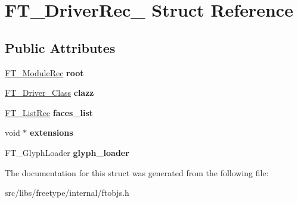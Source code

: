 \hypertarget{struct_f_t___driver_rec__}{
\section{FT\_\-DriverRec\_\- Struct Reference}
\label{struct_f_t___driver_rec__}
}
\subsection*{Public Attributes}
\begin{DoxyCompactItemize}
\item 
\hypertarget{struct_f_t___driver_rec___a8451ceb25c76794fb47e81f477c8222d}{
\hyperlink{struct_f_t___module_rec__}{FT\_\-ModuleRec} {\bfseries root}}
\label{struct_f_t___driver_rec___a8451ceb25c76794fb47e81f477c8222d}

\item 
\hypertarget{struct_f_t___driver_rec___a3111153608e5abeb093ed5eb7fef5aec}{
\hyperlink{struct_f_t___driver___class_rec__}{FT\_\-Driver\_\-Class} {\bfseries clazz}}
\label{struct_f_t___driver_rec___a3111153608e5abeb093ed5eb7fef5aec}

\item 
\hypertarget{struct_f_t___driver_rec___a2602170e3ecde21a764dc32417aaa002}{
\hyperlink{struct_f_t___list_rec__}{FT\_\-ListRec} {\bfseries faces\_\-list}}
\label{struct_f_t___driver_rec___a2602170e3ecde21a764dc32417aaa002}

\item 
\hypertarget{struct_f_t___driver_rec___ad2f1c1a800723dc887dcbc7ce78203d8}{
void $\ast$ {\bfseries extensions}}
\label{struct_f_t___driver_rec___ad2f1c1a800723dc887dcbc7ce78203d8}

\item 
\hypertarget{struct_f_t___driver_rec___ac28e7adbc14ee82c2b7710d0ee5541e2}{
FT\_\-GlyphLoader {\bfseries glyph\_\-loader}}
\label{struct_f_t___driver_rec___ac28e7adbc14ee82c2b7710d0ee5541e2}

\end{DoxyCompactItemize}


The documentation for this struct was generated from the following file:\begin{DoxyCompactItemize}
\item 
src/libs/freetype/internal/ftobjs.h\end{DoxyCompactItemize}
